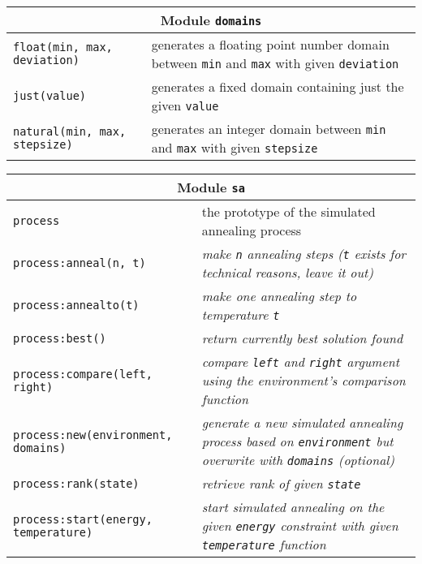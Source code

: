 \begin{appendices}
\begin{table}[H]
\begin{tabular}{|p{5cm}|p{8cm}|}
\hline
\multicolumn{2}{|c|}{Module \texttt{domains}}\\
\hline
\hline
\texttt{float(min, max, deviation)} & generates a floating point number domain between \texttt{min} and \texttt{max} with given \texttt{deviation} \\
\hline
\texttt{just(value)} & generates a fixed domain containing just the given \texttt{value} \\
\hline
\texttt{natural(min, max, stepsize)} & generates an integer domain between \texttt{min} and \texttt{max} with given \texttt{stepsize} \\
\hline
\end{tabular}
\end{table}

\begin{table}[H]
\begin{tabular}{|p{5cm}|p{8cm}|}
\hline
\multicolumn{2}{|c|}{Module \texttt{sa}}\\
\hline
\hline
\texttt{process} & the prototype of the simulated annealing process \\
\hline
\texttt{process:anneal(n, t)} & \emph{make \texttt{n} annealing steps (\texttt{t} exists for technical reasons, leave it out)}\\
\hline
\texttt{process:annealto(t)} & \emph{make one annealing step to temperature \texttt{t}}\\
\hline
\texttt{process:best()} & \emph{return currently best solution found}\\
\hline
\texttt{process:compare(left, right)} & \emph{compare \texttt{left} and \texttt{right} argument using the environment's comparison function}\\
\hline
\texttt{process:new(environment, domains)} & \emph{generate a new simulated annealing process based on \texttt{environment} but overwrite with \texttt{domains} (optional)}\\
\hline
\texttt{process:rank(state)} & \emph{retrieve rank of given \texttt{state}}\\
\hline
\texttt{process:start(energy, temperature)} & \emph{start simulated annealing on the given \texttt{energy} constraint with given \texttt{temperature} function}\\
\hline
\end{tabular}
\end{table}


\end{appendices}
